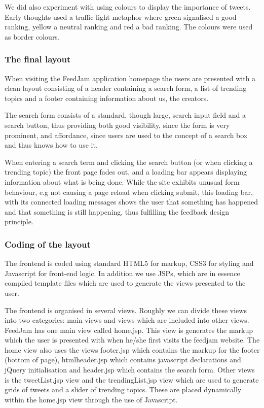 We did also experiment with using colours to display the importance of tweets. Early thoughts used a traffic light metaphor where green signalised a good ranking, yellow a neutral ranking and red a bad ranking. The colours were used as border colours.





\subsubsection{The final layout}
When visiting the FeedJam application homepage the users are presented with a clean layout consisting of a header containing a search form, a list of trending topics and a footer containing information about us, the creators. 

The search form consists of a standard, though large, search input field and a search button, thus providing both good visibility, since the form is very prominent, and affordance, since users are used to the concept of a search box and thus knows how to use it.

When entering a search term and clicking the search button (or when clicking a trending topic) the front page fades out, and a loading bar appears displaying information about what is being done. While the site exhibits unusual form behaviour, e.g not causing a page reload when clicking submit, this loading bar, with its connected loading messages shows the user that something has happened and that something is still happening, thus fulfilling the feedback design principle.


\subsubsection{Coding of the layout}
The frontend is coded using standard HTML5 for markup, CSS3 for styling and Javascript for front-end logic. In addition we use JSPs, which are in essence compiled template files which are used to generate the views presented to the user.

The frontend is organised in several views. Roughly we can divide these views into two categories: main views and views which are included into other views. FeedJam has one main view called home.jsp. This view is generates the markup which the user is presented with when he/she first visits the feedjam website. The home view also uses the views footer.jsp which contains the markup for the footer (bottom of page), htmlheader.jsp which contains javascript declarations and jQuery initialisation and header.jsp which contains the search form. Other views is the tweetList.jsp view and the trendingList.jsp view which are used to generate grids of tweets and a slider of trending topics. These are placed dynamically within the home.jsp view through the use of Javascript.

